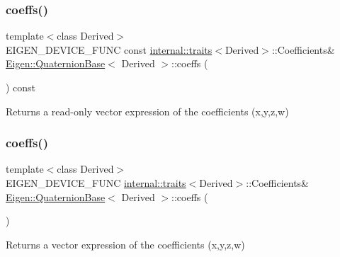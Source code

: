 \subsubsection{\texorpdfstring{coeffs()}{coeffs()}\hspace{0.1cm}{\footnotesize\ttfamily [1/2]}}
{\footnotesize\ttfamily template$<$class Derived$>$ \\
E\+I\+G\+E\+N\+\_\+\+D\+E\+V\+I\+C\+E\+\_\+\+F\+U\+NC const \mbox{\hyperlink{struct_eigen_1_1internal_1_1traits}{internal\+::traits}}$<$Derived$>$\+::Coefficients\& \mbox{\hyperlink{class_eigen_1_1_quaternion_base}{Eigen\+::\+Quaternion\+Base}}$<$ Derived $>$\+::coeffs (\begin{DoxyParamCaption}{ }\end{DoxyParamCaption}) const\hspace{0.3cm}{\ttfamily [inline]}}

\begin{DoxyReturn}{Returns}
a read-\/only vector expression of the coefficients (x,y,z,w) 
\end{DoxyReturn}
\mbox{\label{class_eigen_1_1_quaternion_base_afae737227fb9fb3f3c674cd1fccb4de0}} 
\subsubsection{\texorpdfstring{coeffs()}{coeffs()}\hspace{0.1cm}{\footnotesize\ttfamily [2/2]}}
{\footnotesize\ttfamily template$<$class Derived$>$ \\
E\+I\+G\+E\+N\+\_\+\+D\+E\+V\+I\+C\+E\+\_\+\+F\+U\+NC \mbox{\hyperlink{struct_eigen_1_1internal_1_1traits}{internal\+::traits}}$<$Derived$>$\+::Coefficients\& \mbox{\hyperlink{class_eigen_1_1_quaternion_base}{Eigen\+::\+Quaternion\+Base}}$<$ Derived $>$\+::coeffs (\begin{DoxyParamCaption}{ }\end{DoxyParamCaption})\hspace{0.3cm}{\ttfamily [inline]}}

\begin{DoxyReturn}{Returns}
a vector expression of the coefficients (x,y,z,w) 
\end{DoxyReturn}
\mbox{\label{class_eigen_1_1_quaternion_base_aa82dabadce488031c298a5a0a92cda14}} 
